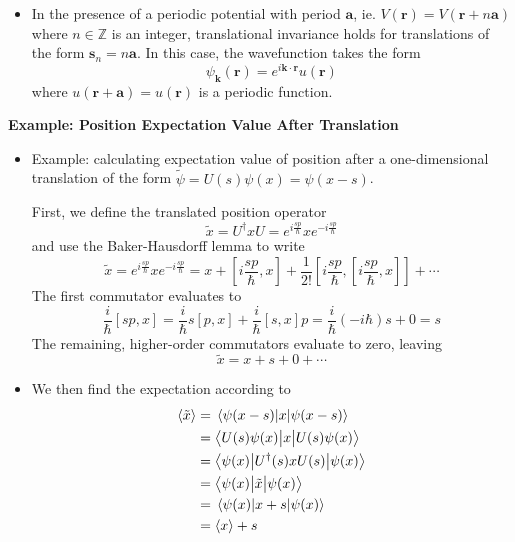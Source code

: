 \documentclass[11pt, a4paper]{article}
\renewcommand{\vec}[1]{\bm{#1}}  %
\renewcommand{\t}[1]{\tilde{#1}}
\renewcommand{\r}{\vec{r}}  %
\newcommand{\p}{\psi}  %
\newcommand{\bmel}[3]{\big \langle {#1} \big | {#2} \big | {#3} \big \rangle}  %
\begin{document}
\begin{itemize}
	\item In the presence of a periodic potential with period $ \vec{a} $, ie. $ V(\r) = V(\r + n \vec{a}) $ where $ n \in \mathbb{Z} $ is an integer, translational invariance holds for translations of the form $ \vec{s}_{n} = n \vec{a} $. In this case, the wavefunction takes the form
	\begin{equation*}
		\psi_{\vec{k}}(\r) = e^{i\vec{k}\cdot \r}u(\r)
	\end{equation*}
	where $ u(\r + \vec{a}) = u(\r) $ is a periodic function. 
	
\end{itemize}	

\textbf{Example: Position Expectation Value After Translation}
\begin{itemize}	
	\item Example: calculating expectation value of position after a one-dimensional translation of the form $ \tilde{\p} = U(s)\p(x) = \p(x - s) $.
	
	First, we define the translated position operator
	\begin{equation*}
		\tilde{x} = U^{\dagger}xU = e^{i\frac{sp}{\hbar}} x e^{-i\frac{sp}{\hbar}}
	\end{equation*}
	and use the Baker-Hausdorff lemma to write
	\begin{equation*}
		\tilde{x} = e^{i\frac{sp}{\hbar}} x e^{-i\frac{sp}{\hbar}} = x + \left[ i \frac{sp}{\hbar}, x\right] + \frac{1}{2!}\left[i\frac{sp}{\hbar}, \left[ i \frac{sp}{\hbar}, x\right]\right] + \cdots 
	\end{equation*}
	The first commutator evaluates to
	\begin{equation*}
		\frac{i}{\hbar}[sp, x] = \frac{i}{\hbar} s[p, x] + \frac{i}{\hbar}[s, x]p = \frac{i}{\hbar}(-i\hbar)s + 0 = s
	\end{equation*}
	The remaining, higher-order commutators evaluate to zero, leaving
	\begin{equation*}
		\tilde{x} = x + s + 0 + \cdots
	\end{equation*}
	
	\item We then find the expectation according to 
	\begin{align*}
		\ev{\tilde{x}} &= \mel{\p(x-s)}{x}{\p(x - s)} \\
		& = \bmel{U(s)\p(x)}{x}{U(s)\p(x)}\\
		& = \bmel{\p(x)}{U^{\dagger}(s)xU(s)}{\p(x)}\\
		& = \bmel{\p(x)}{\t{x}}{\p(x)}\\
		& = \mel{\p(x)}{x + s}{\p(x)}\\
		& = \ev{x} + s
	\end{align*}
	 
\end{itemize}
\end{document}
